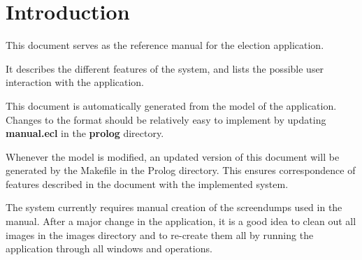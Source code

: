 \chapter{Introduction}
This document serves as the reference manual for the election application.

It describes the different features of the system, and lists the possible user interaction with the application. 

This document is automatically generated from the model of the application. Changes to the format should be relatively easy to implement by updating \textbf{manual.ecl} in the \textbf{prolog} directory.

Whenever the model is modified, an updated version of this document will be generated by the Makefile in the Prolog directory. This ensures correspondence of features described in the document with the implemented system.

The system currently requires manual creation of the screendumps used in the manual. After a major change in the application, it is a good idea to clean out all images in the images directory and to re-create them all by running the application through all windows and operations.

